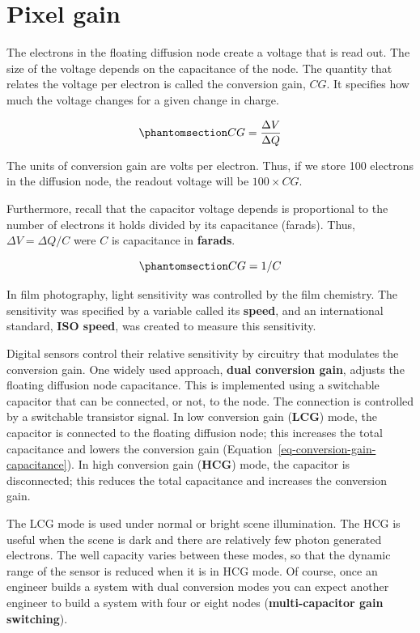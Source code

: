 \documentclass[
  letterpaper,
]{book}
\begin{document}
\section{Pixel gain}\label{sec-pixel-gain}

The electrons in the floating diffusion node create a voltage that is
read out. The size of the voltage depends on the capacitance of the
node. The quantity that relates the voltage per electron is called the
conversion gain, \(CG\). It specifies how much the voltage changes for a
given change in charge.

\begin{equation}\phantomsection\label{eq-conversion-gain}{
CG = \frac{\Delta V}{\Delta Q}
}\end{equation}

The units of conversion gain are volts per electron. Thus, if we store
100 electrons in the diffusion node, the readout voltage will be
\(100 \times CG\).

Furthermore, recall that the capacitor voltage depends is proportional
to the number of electrons it holds divided by its capacitance (farads).
Thus, \(\Delta V = \Delta Q / C\) were \(C\) is capacitance in
\textbf{farads}.

\begin{equation}\phantomsection\label{eq-conversion-gain-capacitance}{
CG = 1 / C
}\end{equation}

In film photography, light sensitivity was controlled by the film
chemistry. The sensitivity was specified by a variable called its
\textbf{speed}, and an international standard, \textbf{ISO speed}, was
created to measure this sensitivity.

Digital sensors control their relative sensitivity by circuitry that
modulates the conversion gain. One widely used approach, \textbf{dual
conversion gain}, adjusts the floating diffusion node capacitance. This
is implemented using a switchable capacitor that can be connected, or
not, to the node. The connection is controlled by a switchable
transistor signal. In low conversion gain (\textbf{LCG}) mode, the
capacitor is connected to the floating diffusion node; this increases
the total capacitance and lowers the conversion gain
(Equation~\ref{eq-conversion-gain-capacitance}). In high conversion gain
(\textbf{HCG}) mode, the capacitor is disconnected; this reduces the
total capacitance and increases the conversion gain.

The LCG mode is used under normal or bright scene illumination. The HCG
is useful when the scene is dark and there are relatively few photon
generated electrons. The well capacity varies between these modes, so
that the dynamic range of the sensor is reduced when it is in HCG mode.
Of course, once an engineer builds a system with dual conversion modes
you can expect another engineer to build a system with four or eight
nodes (\textbf{multi-capacitor gain switching}).
\end{document}
